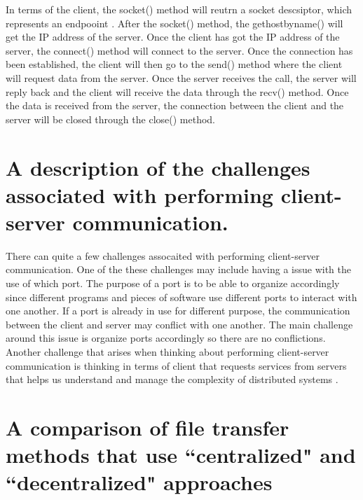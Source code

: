 \documentclass{article}
\begin{document}
In terms of the client, the socket() method will reutrn a socket descsiptor, which represents an endpooint \cite{ibm_knowledge_center}. After the socket() method, the gethostbyname() will get the IP address of the server. Once the client has got the IP address of the server, the connect() method will connect to the server. Once the connection has been established, the client will then go to the send() method where the client will request data from the server. Once the server receives the call, the server will reply back and the client will receive the data through the recv() method. Once the data is received from the server, the connection between the client and the server will be closed through the close() method. 

\section{A description of the challenges associated with performing client-server communication.}

There can quite a few challenges assocaited with performing client-server communication. One of the these challenges may include having a issue with the use of which port. The purpose of a port is to be able to organize accordingly since different programs and pieces of software use different ports to interact with one another. If a port is already in use for different purpose, the communication between the client and server may conflict with one another. The main challenge around this issue is organize ports accordingly so there are no conflictions. Another challenge that arises when thinking about performing client-server communication is thinking in terms of client that requests services from servers that helps us understand and manage the complexity of distributed systems \cite{tanenbaum_steen_2007}.

\section{A comparison of file transfer methods that use ``centralized" and ``decentralized" approaches}
\end{document}
